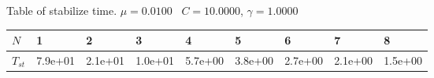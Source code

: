\begin{center}
Table of stabilize time. $\mu = 0.0100$ \, $C = 10.0000$, $\gamma = 1.0000$
  
\begin{tabular}{|p{0.6in}|p{0.6in}|p{0.6in}|p{0.6in}|p{0.6in}|p{0.6in}|p{0.6in}|p{0.6in}|p{0.6in}|} \hline
$N$ &1 &2 &3 &4 &5 &6 &7 &8 \\ \hline 
$T_{st}$ &7.9e+01 &2.1e+01 &1.0e+01 &5.7e+00 &3.8e+00 &2.7e+00 &2.1e+00 &1.5e+00 \\ \hline 

\end{tabular}\\[20pt]
\end{center}
